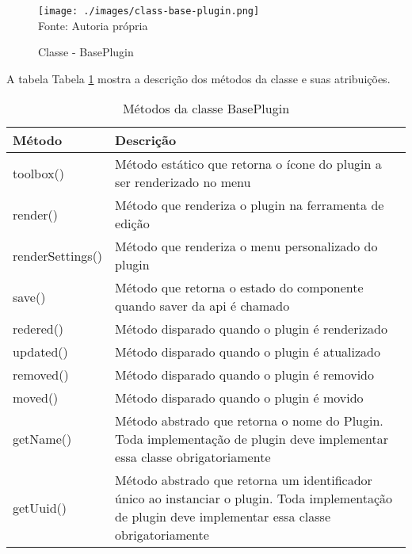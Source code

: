 \begin{figure}[H]
    \centering
    \caption{Classe - BasePlugin}
    \texttt{[image: ./images/class-base-plugin.png]}
    \label{fig:class-base-plugin} \\
    \textnormal{\fontsize{10pt}{12pt}Fonte: Autoria própria}
\end{figure}

A tabela
Tabela \ref{tbl:base-plugin-methods}
mostra a descrição dos métodos da classe e suas atribuições.

\begin{table}[H]
    \centering
    \caption{Métodos da classe BasePlugin}
    \label{tbl:base-plugin-methods}
    \renewcommand{\arraystretch}{1.5}
    \begin{tabular}{p{5.6000cm} p{10.4000cm}}
        \hline
        \textbf{Método} & \textbf{Descrição} \\
        \hline
        toolbox() & Método estático que retorna o ícone do plugin a ser renderizado no menu \\
		render() & Método que renderiza o plugin na ferramenta de edição
             \\
		renderSettings() & Método que renderiza o menu personalizado do plugin
             \\
		save() & Método que retorna o estado do componente quando saver da
                \acrshort{api}
                é chamado
             \\
		redered() & Método disparado quando o plugin é renderizado
             \\
		updated() & Método disparado quando o plugin é atualizado
             \\
		removed() & Método disparado quando o plugin é removido
             \\
		moved() & Método disparado quando o plugin é movido
             \\
		getName() & Método abstrado que retorna o nome do Plugin.
                Toda implementação de plugin deve implementar essa
                classe obrigatoriamente
             \\
		getUuid() & Método abstrado que retorna um identificador único ao instanciar o plugin.
                Toda implementação de plugin deve implementar essa
                classe obrigatoriamente
             \\
        \hline
        
    \end{tabular}
\end{table}

